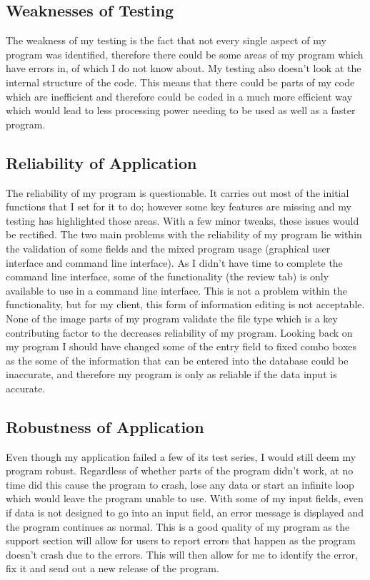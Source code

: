 \subsection{Weaknesses of Testing}

The weakness of my testing is the fact that not every single aspect of my program was identified, therefore there could be some areas of my program which have errors in, of which I do not know about. My testing also doesn't look at the internal structure of the code. This means that there could be parts of my code which are inefficient and therefore could be coded in a much more efficient way which would lead to less processing power needing to be used as well as a faster program.

\subsection{Reliability of Application}

The reliability of my program is questionable. It carries out most of the initial functions that I set for it to do; however some key features are missing and my testing has highlighted those areas. With a few minor tweaks, these issues would be rectified. The two main problems with the reliability of my program lie within the validation of some fields and the mixed program usage (graphical user interface and command line interface). As I didn't have time to complete the command line interface, some of the functionality (the review tab) is only available to use in a command line interface. This is not a problem within the functionality, but for my client, this form of information editing is not acceptable. None of the image parts of my program validate the file type which is a key contributing factor to the decreases reliability of my program. Looking back on my program I should have changed some of the entry field to fixed combo boxes as the some of the information that can be entered into the database could be inaccurate, and therefore my program is only as reliable if the data input is accurate.

\subsection{Robustness of Application}

Even though my application failed a few of its test series, I would still deem my program robust. Regardless of whether parts of the program didn't work, at no time did this cause the program to crash, lose any data or start an infinite loop which would leave the program unable to use. With some of my input fields, even if data is not designed to go into an input field, an error message is displayed and the program continues as normal. This is a good quality of my program as the support section will allow for users to report errors that happen as the program doesn't crash due to the errors. This will then allow for me to identify the error, fix it and send out a new release of the program.